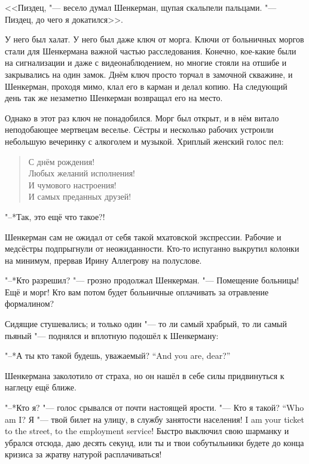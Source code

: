 <<Пиздец, "--- весело думал Шенкерман, щупая скальпели пальцами.
"--- Пиздец, до чего я докатился>>.

У него был халат.
У него был даже ключ от морга.
Ключи от больничных моргов стали для Шенкермана важной частью расследования.
Конечно, кое-какие были на сигнализации и даже с видеонаблюдением, но многие стояли на отшибе и закрывались на один замок.
Днём ключ просто торчал в замочной скважине, и Шенкерман, проходя мимо, клал его в карман и делал копию.
На следующий день так же незаметно Шенкерман возвращал его на место.

Однако в этот раз ключ не понадобился.
Морг был открыт, и в нём витало неподобающее мертвецам веселье.
Сёстры и несколько рабочих устроили небольшую вечеринку с алкоголем и музыкой.
Хриплый женский голос пел:

\begin{verse}
С днём рождения!\\
Любых желаний исполнения!\\
И чумового настроения!\\
И самых преданных друзей!
\end{verse}

"--*Так, это ещё что такое?!

Шенкерман сам не ожидал от себя такой мхатовской экспрессии.
Рабочие и медсёстры подпрыгнули от неожиданности.
Кто-то испуганно выкрутил колонки на минимум, прервав Ирину Аллегрову на полуслове.

"--*Кто разрешил? "--- грозно продолжал Шенкерман.
"--- Помещение больницы!
Ещё и морг!
Кто вам потом будет больничные оплачивать за отравление формалином?

Сидящие стушевались;
и только один "--- то ли самый храбрый, то ли самый пьяный "--- поднялся и вплотную подошёл к Шенкерману:

{"--*А ты кто такой будешь, уважаемый?}
{``And you are, dear?''}

Шенкермана заколотило от страха, но он нашёл в себе силы придвинуться к наглецу ещё ближе.

"--*Кто я? "--- голос срывался от почти настоящей ярости.
{"--- Кто я такой?}
{``Who am I?}
{Я "--- твой билет на улицу, в службу занятости населения!}
{I am your ticket to the street, to the employment service!}
Быстро выключил свою шарманку и убрался отсюда, даю десять секунд, или ты и твои собутыльники будете до конца кризиса за жратву натурой расплачиваться!

